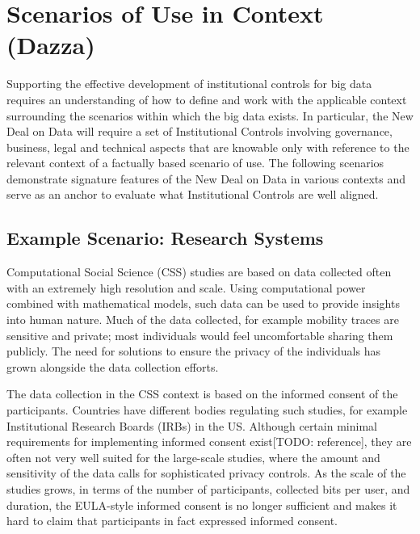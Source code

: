  \section{Scenarios of Use in Context (Dazza)}

Supporting the effective development of institutional controls for big data requires an understanding of how to define and work with the applicable context surrounding the scenarios within which the big data exists. In particular, the New Deal on Data will require a set of Institutional Controls involving governance, business, legal and technical aspects that are knowable only with reference to the relevant context of a factually based scenario of use. The following scenarios demonstrate signature features of the New Deal on Data in various contexts and serve as an anchor to evaluate what Institutional Controls are well aligned.

 \subsection{Example Scenario: Research Systems}

Computational Social Science (CSS) studies are based on data collected often with an extremely high resolution and scale. Using computational power combined with mathematical models, such data can be used to provide insights into human nature. Much of the data collected, for example mobility traces are sensitive and private; most individuals would feel uncomfortable sharing them publicly. The need for solutions to ensure the privacy of the individuals has grown alongside the data collection efforts.

The data collection in the CSS context is based on the informed consent of the participants. Countries have different bodies regulating such studies, for example Institutional Research Boards (IRBs) in the US. Although certain minimal requirements for implementing informed consent exist[TODO: reference], they are often not very well suited for the large-scale studies, where the amount and sensitivity of the data calls for sophisticated privacy controls. As the scale of the studies grows, in terms of the number of participants, collected bits per user, and duration, the EULA-style informed consent is no longer sufficient and makes it hard to claim that participants in fact expressed informed consent.

